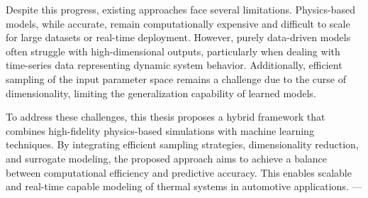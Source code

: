 Despite this progress, existing approaches face several limitations. Physics-based models, while accurate, remain computationally expensive and difficult to scale for large datasets or real-time deployment. However, purely data-driven models often struggle with high-dimensional outputs, particularly when dealing with time-series data representing dynamic system behavior. Additionally, efficient sampling of the input parameter space remains a challenge due to the curse of dimensionality, limiting the generalization capability of learned models.

To address these challenges, this thesis proposes a hybrid framework that combines high-fidelity physics-based simulations with machine learning techniques. By integrating efficient sampling strategies, dimensionality reduction, and surrogate modeling, the proposed approach aims to achieve a balance between computational efficiency and predictive accuracy. This enables scalable and real-time capable modeling of thermal systems in automotive applications.
---




